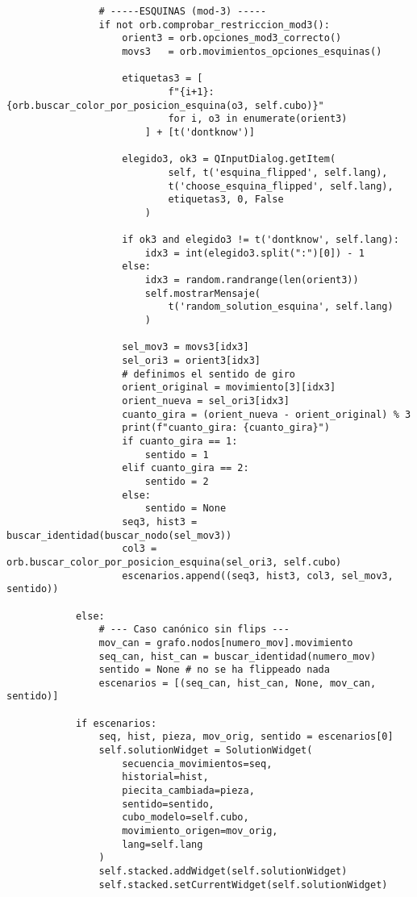 \begin{lstlisting}
                # -----ESQUINAS (mod-3) -----
                if not orb.comprobar_restriccion_mod3():
                    orient3 = orb.opciones_mod3_correcto()  
                    movs3   = orb.movimientos_opciones_esquinas() 

                    etiquetas3 = [
                            f"{i+1}: {orb.buscar_color_por_posicion_esquina(o3, self.cubo)}"
                            for i, o3 in enumerate(orient3)
                        ] + [t('dontknow')]
                    
                    elegido3, ok3 = QInputDialog.getItem(
                            self, t('esquina_flipped', self.lang),
                            t('choose_esquina_flipped', self.lang),
                            etiquetas3, 0, False
                        )

                    if ok3 and elegido3 != t('dontknow', self.lang):
                        idx3 = int(elegido3.split(":")[0]) - 1
                    else:
                        idx3 = random.randrange(len(orient3))
                        self.mostrarMensaje(
                            t('random_solution_esquina', self.lang)
                        )
                        
                    sel_mov3 = movs3[idx3]
                    sel_ori3 = orient3[idx3]
                    # definimos el sentido de giro
                    orient_original = movimiento[3][idx3]
                    orient_nueva = sel_ori3[idx3]
                    cuanto_gira = (orient_nueva - orient_original) % 3
                    print(f"cuanto_gira: {cuanto_gira}")    
                    if cuanto_gira == 1:
                        sentido = 1
                    elif cuanto_gira == 2:
                        sentido = 2
                    else:
                        sentido = None                        
                    seq3, hist3 = buscar_identidad(buscar_nodo(sel_mov3))
                    col3 = orb.buscar_color_por_posicion_esquina(sel_ori3, self.cubo)
                    escenarios.append((seq3, hist3, col3, sel_mov3, sentido))

            else:
                # --- Caso canónico sin flips ---
                mov_can = grafo.nodos[numero_mov].movimiento
                seq_can, hist_can = buscar_identidad(numero_mov)
                sentido = None # no se ha flippeado nada
                escenarios = [(seq_can, hist_can, None, mov_can, sentido)]

            if escenarios:
                seq, hist, pieza, mov_orig, sentido = escenarios[0]
                self.solutionWidget = SolutionWidget(
                    secuencia_movimientos=seq,
                    historial=hist,
                    piecita_cambiada=pieza,
                    sentido=sentido,
                    cubo_modelo=self.cubo,
                    movimiento_origen=mov_orig,
                    lang=self.lang
                )
                self.stacked.addWidget(self.solutionWidget)
                self.stacked.setCurrentWidget(self.solutionWidget)


\end{lstlisting}

